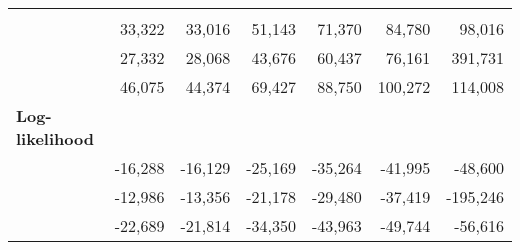 \begin{tabular}{lllllll}
  \multicolumn{1}{|r}{} &
  \multicolumn{1}{r}{} &
  \multicolumn{1}{r}{} &
  \multicolumn{1}{r}{} &
  \multicolumn{1}{r}{} &
  \multicolumn{1}{r}{} \\
\multicolumn{1}{l}{\hspace{1em}{Model (A)}} &
  \multicolumn{1}{|r}{33,322} &
  \multicolumn{1}{r}{33,016} &
  \multicolumn{1}{r}{51,143} &
  \multicolumn{1}{r}{71,370} &
  \multicolumn{1}{r}{84,780} &
  \multicolumn{1}{r}{98,016} \\
\multicolumn{1}{l}{\hspace{1em}{Model (B)}} &
  \multicolumn{1}{|r}{27,332} &
  \multicolumn{1}{r}{28,068} &
  \multicolumn{1}{r}{43,676} &
  \multicolumn{1}{r}{60,437} &
  \multicolumn{1}{r}{76,161} &
  \multicolumn{1}{r}{391,731} \\
\multicolumn{1}{l}{\hspace{1em}{Model (C)}} &
  \multicolumn{1}{|r}{46,075} &
  \multicolumn{1}{r}{44,374} &
  \multicolumn{1}{r}{69,427} &
  \multicolumn{1}{r}{88,750} &
  \multicolumn{1}{r}{100,272} &
  \multicolumn{1}{r}{114,008} \\
\multicolumn{1}{l}{\textbf{Log-likelihood}} &
  \multicolumn{1}{|r}{} &
  \multicolumn{1}{r}{} &
  \multicolumn{1}{r}{} &
  \multicolumn{1}{r}{} &
  \multicolumn{1}{r}{} &
  \multicolumn{1}{r}{} \\
\multicolumn{1}{l}{\hspace{1em}{Model (A)}} &
  \multicolumn{1}{|r}{-16,288} &
  \multicolumn{1}{r}{-16,129} &
  \multicolumn{1}{r}{-25,169} &
  \multicolumn{1}{r}{-35,264} &
  \multicolumn{1}{r}{-41,995} &
  \multicolumn{1}{r}{-48,600} \\
\multicolumn{1}{l}{\hspace{1em}{Model (B)}} &
  \multicolumn{1}{|r}{-12,986} &
  \multicolumn{1}{r}{-13,356} &
  \multicolumn{1}{r}{-21,178} &
  \multicolumn{1}{r}{-29,480} &
  \multicolumn{1}{r}{-37,419} &
  \multicolumn{1}{r}{-195,246} \\
\multicolumn{1}{l}{\hspace{1em}{Model (C)}} &
  \multicolumn{1}{|r}{-22,689} &
  \multicolumn{1}{r}{-21,814} &
  \multicolumn{1}{r}{-34,350} &
  \multicolumn{1}{r}{-43,963} &
  \multicolumn{1}{r}{-49,744} &
  \multicolumn{1}{r}{-56,616} \\
\cline{1-7}
\end{tabular}
